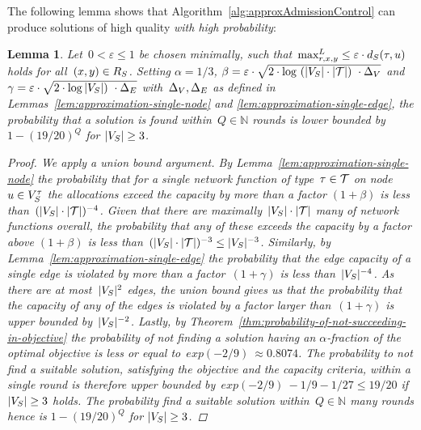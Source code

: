\documentclass[10pt, conference, letterpaper]{IEEEtran}
\newtheorem{lemma}[theorem]{Lemma}
\begin{document}
The following lemma shows that Algorithm~\ref{alg:approxAdmissionControl} can produce solutions of high quality \emph{with high probability}:

\begin{lemma}
Let~$0 < \varepsilon \leq 1$ be chosen minimally, such that~$\maxLoadV[\req][x][y] \leq \varepsilon \cdot \Scap(\type,u)$ holds for all~$(x,y) \in  R_{S}$.  Setting $\alpha = 1/3$, $\beta = \varepsilon \cdot \sqrt{2\cdot \log~(|V_S|\cdot|\mathcal{T}|)~\cdot \Delta_V  }$ and~$\gamma = \varepsilon \cdot \sqrt{2\cdot \log |V_S|)~\cdot \Delta_E  }$ with~$\Delta_V,\Delta_E$ as defined in Lemmas~\ref{lem:approximation-single-node} and \ref{lem:approximation-single-edge}, the probability that a solution is found within~$Q \in \mathbb{N}$ rounds is lower bounded by~$1 -(19/20)^Q$ for $|V_S| \geq 3$.
\begin{proof}
We apply a union bound argument. By Lemma~\ref{lem:approximation-single-node} the probability that for a single network function of type~$\tau \in \mathcal{T}$ on node~$u \in V^{\tau}_{S}$ the allocations exceed the capacity by more than a factor $(1+\beta)$ is less than~$(|V_S| \cdot |\mathcal{T}|)^{-4}$. Given that there are maximally~$|V_S| \cdot |\mathcal{T}|$ many of network functions overall, the probability that any of these exceeds the capacity by a factor above $(1+\beta)$ is less than~$(|V_S| \cdot |\mathcal{T}|)^{-3} \leq |V_S|^{-3}$. Similarly, by Lemma~\ref{lem:approximation-single-edge} the probability that the edge capacity of a single edge is violated by more than a factor~$(1+\gamma)$ is less than~$|V_S|^{-4}$. As there are at most~$|V_S|^2$ edges, the union bound gives us that the probability that the capacity of any of the edges is violated by a factor larger than~$(1+\gamma)$ is upper bounded by~$|V_S|^{-2}$.  Lastly, by Theorem~\ref{thm:probability-of-not-succeeding-in-objective} the probability of \emph{not} finding a solution having an $\alpha$-fraction of the optimal objective is less or equal to~$exp(-2/9)~\approx 0.8074$. The probability to not find a suitable solution, satisfying the objective and the capacity criteria, within a single round is therefore upper bounded by~$exp(-2/9)~- 1/9 - 1/27 \leq 19/20$ if~$|V_S| \geq 3$ holds. The probability find a suitable solution within~$Q \in \mathbb{N}$ many rounds hence is $1-(19/20)^Q$ for $|V_S| \geq 3$.
\end{proof}
\end{lemma}
\end{document}
